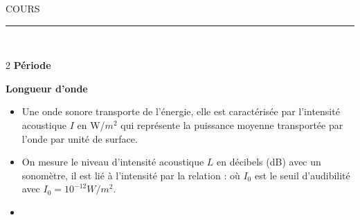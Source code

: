 \documentclass[11pt,a4paper]{article}
\newcommand{\cadreblanc}[1]{%
\medskip\framebox[\linewidth][c]{%
\rule{0mm}{#1mm}}\par
\medskip}
\begin{document}
\begin{center}
\LARGE{COURS}
\end{center}




\hrule

\vspace{1cm}


\\

\cadreblanc{25}
\cadreblanc{25}
\vspace{2mm}

\begin{multicols}{2}
\textbf{Période}\\
\cadreblanc{35}
\textbf{Longueur d'onde}\\
\cadreblanc{34}
\end{multicols}

\begin{itemize}
\item Une onde sonore transporte de l'énergie, elle est caractérisée par l'intensité acoustique $I$ en W/$m^2$ qui représente la puissance moyenne transportée par l'onde par unité de surface. 
\item On mesure le niveau d'intensité acoustique $L$ en décibels (dB) avec un sonomètre, il est lié à l'intensité par la relation :  où $I_0$ est le seuil d'audibilité avec $I_0=10^{-12} W/m^2$.
\item \cadreblanc{14}

\end{itemize}

\\

\cadreblanc{15}
\cadreblanc{12}
\end{document}
